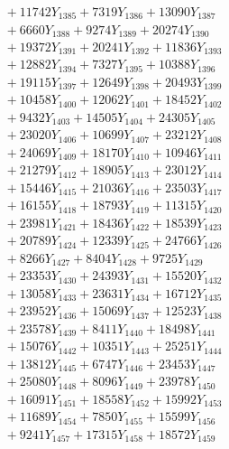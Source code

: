 \documentclass[a4paper,10pt]{article}
\begin{document}
{\begin{align}
&\;  + 11742 Y_{1385} + 7319 Y_{1386} + 13090 Y_{1387} \\[0.3ex]
&\;  + 6660 Y_{1388} + 9274 Y_{1389} + 20274 Y_{1390} \\[0.3ex]
&\;  + 19372 Y_{1391} + 20241 Y_{1392} + 11836 Y_{1393} \\[0.3ex]
&\;  + 12882 Y_{1394} + 7327 Y_{1395} + 10388 Y_{1396} \\[0.3ex]
&\;  + 19115 Y_{1397} + 12649 Y_{1398} + 20493 Y_{1399} \\[0.3ex]
&\;  + 10458 Y_{1400} + 12062 Y_{1401} + 18452 Y_{1402} \\[0.3ex]
&\;  + 9432 Y_{1403} + 14505 Y_{1404} + 24305 Y_{1405} \\[0.3ex]
&\;  + 23020 Y_{1406} + 10699 Y_{1407} + 23212 Y_{1408} \\[0.5ex]\allowbreak
&\;  + 24069 Y_{1409} + 18170 Y_{1410} + 10946 Y_{1411} \\[0.3ex]
&\;  + 21279 Y_{1412} + 18905 Y_{1413} + 23012 Y_{1414} \\[0.3ex]
&\;  + 15446 Y_{1415} + 21036 Y_{1416} + 23503 Y_{1417} \\[0.3ex]
&\;  + 16155 Y_{1418} + 18793 Y_{1419} + 11315 Y_{1420} \\[0.3ex]
&\;  + 23981 Y_{1421} + 18436 Y_{1422} + 18539 Y_{1423} \\[0.3ex]
&\;  + 20789 Y_{1424} + 12339 Y_{1425} + 24766 Y_{1426} \\[0.3ex]
&\;  + 8266 Y_{1427} + 8404 Y_{1428} + 9725 Y_{1429} \\[0.3ex]
&\;  + 23353 Y_{1430} + 24393 Y_{1431} + 15520 Y_{1432} \\[0.3ex]
&\;  + 13058 Y_{1433} + 23631 Y_{1434} + 16712 Y_{1435} \\[0.3ex]
&\;  + 23952 Y_{1436} + 15069 Y_{1437} + 12523 Y_{1438} \\[0.5ex]\allowbreak
&\;  + 23578 Y_{1439} + 8411 Y_{1440} + 18498 Y_{1441} \\[0.3ex]
&\;  + 15076 Y_{1442} + 10351 Y_{1443} + 25251 Y_{1444} \\[0.3ex]
&\;  + 13812 Y_{1445} + 6747 Y_{1446} + 23453 Y_{1447} \\[0.3ex]
&\;  + 25080 Y_{1448} + 8096 Y_{1449} + 23978 Y_{1450} \\[0.3ex]
&\;  + 16091 Y_{1451} + 18558 Y_{1452} + 15992 Y_{1453} \\[0.3ex]
&\;  + 11689 Y_{1454} + 7850 Y_{1455} + 15599 Y_{1456} \\[0.3ex]
&\;  + 9241 Y_{1457} + 17315 Y_{1458} + 18572 Y_{1459} \\[0.3ex]

\end{align}}
\end{document}
